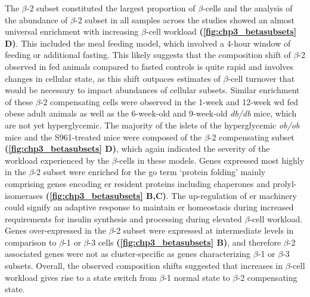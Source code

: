\par The $\beta$-2 subset constituted the largest proportion of $\beta$-cells and the analysis of the abundance of $\beta$-2 subset in all samples across the studies showed an almost universal enrichment with increasing $\beta$-cell workload \textbf{(\autoref{fig:chp3_betasubsets} D)}. This included the meal feeding model, which involved a 4-hour window of feeding or additional fasting. This likely suggests that the composition shift of $\beta$-2 observed in fed animals compared to fasted controls is quite rapid and involves changes in cellular state, as this shift outpaces estimates of $\beta$-cell turnover that would be necessary to impact abundances of cellular subsets. Similar enrichment of these $\beta$-2 compensating cells were observed in the 1-week and 12-week \gls{wd} fed obese adult animals as well as the 6-week-old and 9-week-old \textit{db/db} mice, which are not yet hyperglycemic. The majority of the islets of the hyperglycemic \textit{ob/ob} mice and the S961-treated mice were composed of the $\beta$-2 compensating subset \textbf{(\autoref{fig:chp3_betasubsets} D)}, which again indicated the severity of the workload experienced by the $\beta$-cells in these models. Genes expressed most highly in the $\beta$-2 subset were enriched for the \gls{go} term `protein folding' mainly comprising genes encoding \gls{er} resident proteins including chaperones and prolyl-isomerases \textbf{(\ref{fig:chp3_betasubsets} B,C)}. The up-regulation of \gls{er} machinery could signify an adaptive response to maintain \gls{er} homeostasis during increased requirements for insulin synthesis and processing during elevated $\beta$-cell workload. Genes over-expressed in the $\beta$-2 subset were expressed at intermediate levels in comparison to $\beta$-1 or $\beta$-3 cells \textbf{(\autoref{fig:chp3_betasubsets} B)}, and therefore $\beta$-2 associated genes were not as cluster-specific as genes characterizing $\beta$-1 or $\beta$-3 subsets. Overall, the observed composition shifts suggested that increases in $\beta$-cell workload gives rise to a state switch from $\beta$-1 normal state to $\beta$-2 compensating state.\\

